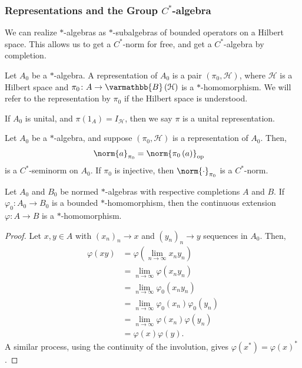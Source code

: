 \documentclass[10pt]{mypackage}
\renewcommand*{\mathbb}[1]{\varmathbb{#1}}
\newcommand{\B}{\mathbb{B}}
\begin{document}
\subsubsection{Representations and the Group $C^{\ast}$-algebra}%
We can realize $\ast$-algebras as $\ast$-subalgebras of bounded operators on a Hilbert space. This allows us to get a $C^{\ast}$-norm for free, and get a $C^{\ast}$-algebra by completion.
\begin{definition}
  Let $A_0$ be a $\ast$-algebra. A representation of $A_0$ is a pair $\left(\pi_0,\mathcal{H}\right)$, where $\mathcal{H}$ is a Hilbert space and $\pi_0\colon A\rightarrow \B\left(\mathcal{H}\right)$ is a $\ast$-homomorphism. We will refer to the representation by $\pi_0$ if the Hilbert space is understood.\newline

  If $A_0$ is unital, and $\pi\left(1_A\right) = I_{\mathcal{H}}$, then we say $\pi$ is a unital representation.
\end{definition}
\begin{lemma}
  Let $A_0$ be a $\ast$-algebra, and suppose $\left(\pi_0,\mathcal{H}\right)$ is a representation of $A_0$. Then,
  \begin{align*}
    \norm{a}_{\pi_0} &= \norm{\pi_0\left(a\right)}_{\text{op}}
  \end{align*}
  is a $C^{\ast}$-seminorm on $A_0$. If $\pi_0$ is injective, then $\norm{\cdot}_{\pi_0}$ is a $C^{\ast}$-norm.
\end{lemma}
\begin{lemma}
  Let $A_0$ and $B_0$ be normed $\ast$-algebras with respective completions $A$ and $B$. If $\varphi_0\colon A_0\rightarrow B_0$ is a bounded $\ast$-homomorphism, then the continuous extension $\varphi\colon A\rightarrow B$ is a $\ast$-homomorphism.
\end{lemma}
\begin{proof}
  Let $x,y\in A$ with $\left(x_n\right)_n\rightarrow x$ and $\left(y_n\right)_n\rightarrow y$ sequences in $A_0$. Then,
  \begin{align*}
    \varphi\left(xy\right) &= \varphi\left(\lim_{n\rightarrow\infty}x_ny_n\right)\\
                           &= \lim_{n\rightarrow\infty}\varphi\left(x_ny_n\right)\\
                           &= \lim_{n\rightarrow\infty}\varphi_0\left(x_ny_n\right)\\
                           &= \lim_{n\rightarrow\infty}\varphi_0\left(x_n\right)\varphi_0\left(y_n\right)\\
                           &= \lim_{n\rightarrow\infty}\varphi\left(x_n\right)\varphi\left(y_n\right)\\
                           &= \varphi\left(x\right)\varphi\left(y\right).
  \end{align*}
  A similar process, using the continuity of the involution, gives $\varphi\left(x^{\ast}\right) = \varphi\left(x\right)^{\ast}$.
\end{proof}
\end{document}
